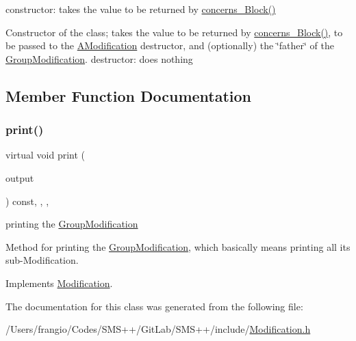 constructor\+: takes the value to be returned by \mbox{\hyperlink{class_s_m_spp__di__unipi__it_1_1_modification_a22fe0cccfc755cfd89b240587d1f1cad}{concerns\+\_\+\+Block()}} 

Constructor of the class; takes the value to be returned by \mbox{\hyperlink{class_s_m_spp__di__unipi__it_1_1_modification_a22fe0cccfc755cfd89b240587d1f1cad}{concerns\+\_\+\+Block()}}, to be passed to the \mbox{\hyperlink{class_s_m_spp__di__unipi__it_1_1_a_modification}{A\+Modification}} destructor, and (optionally) the \char`\"{}father\char`\"{} of the \mbox{\hyperlink{class_s_m_spp__di__unipi__it_1_1_group_modification}{Group\+Modification}}. destructor\+: does nothing 

\subsection{Member Function Documentation}
\mbox{\label{class_s_m_spp__di__unipi__it_1_1_group_modification_a59a9fcbf8f9f86d348344b2073644b0e}} 
\subsubsection{\texorpdfstring{print()}{print()}}
{\footnotesize\ttfamily virtual void print (\begin{DoxyParamCaption}\item[{std\+::ostream \&}]{output }\end{DoxyParamCaption}) const\hspace{0.3cm}{\ttfamily [inline]}, {\ttfamily [override]}, {\ttfamily [protected]}, {\ttfamily [virtual]}}



printing the \mbox{\hyperlink{class_s_m_spp__di__unipi__it_1_1_group_modification}{Group\+Modification}} 

Method for printing the \mbox{\hyperlink{class_s_m_spp__di__unipi__it_1_1_group_modification}{Group\+Modification}}, which basically means printing all its sub-\/\+Modification. 

Implements \mbox{\hyperlink{class_s_m_spp__di__unipi__it_1_1_modification_a74372464f55d9c2cfdb603bf030f902f}{Modification}}.



The documentation for this class was generated from the following file\+:\begin{DoxyCompactItemize}
\item 
/\+Users/frangio/\+Codes/\+S\+M\+S++/\+Git\+Lab/\+S\+M\+S++/include/\mbox{\hyperlink{_modification_8h}{Modification.\+h}}\end{DoxyCompactItemize}
